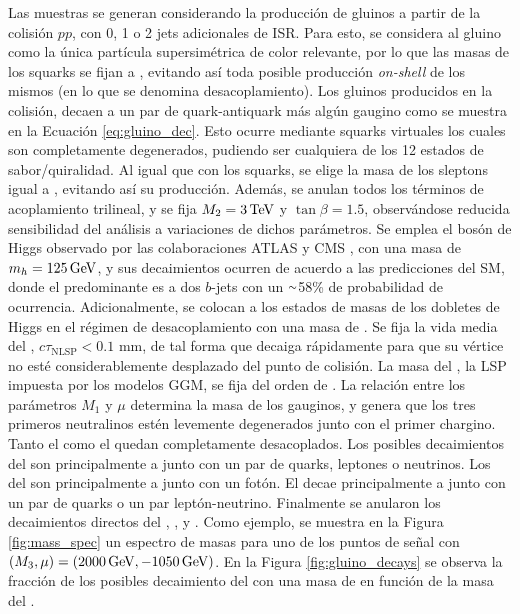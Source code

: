 Las muestras se generan considerando la producción de gluinos a partir de la colisión $pp$, con 0, 1 o 2 jets adicionales de ISR. Para esto, se considera al gluino como la única partícula supersimétrica de color relevante, por lo que las masas de los squarks se fijan a , evitando así toda posible producción \textit{on-shell} de los mismos (en lo que se denomina desacoplamiento). Los gluinos producidos en la colisión, decaen a un par de quark-antiquark más algún gaugino como se muestra en la Ecuación \ref{eq:gluino_dec}. Esto ocurre mediante squarks virtuales los cuales son completamente degenerados, pudiendo ser cualquiera de los 12 estados de sabor/quiralidad.
Al igual que con los squarks, se elige la masa de los sleptons igual a , evitando así su producción.
Además, se anulan todos los términos de acoplamiento trilineal, y se fija $M_2=3\,\text{TeV}$ y $\tan{\beta}=1.5$, observándose reducida sensibilidad del análisis a variaciones de dichos parámetros. Se emplea el bosón de Higgs observado por las colaboraciones ATLAS y CMS \cite{higgs_mass}, con una masa de $m_h=125\,\text{GeV}$, y sus decaimientos ocurren de acuerdo a las predicciones del SM, 
donde el predominante es a dos $b$-jets con un {$\smallsim$}58\% de probabilidad de ocurrencia.
Adicionalmente, se colocan a los estados de masas de los dobletes de Higgs en el régimen de desacoplamiento con una masa de .
Se fija la vida media del \ninoone, $c\tau_{\text{NLSP}}<0.1$ mm, de tal forma que decaiga rápidamente para que su vértice no esté considerablemente desplazado del punto de colisión. 
La masa del \gravino, la LSP impuesta por los modelos GGM, se fija del orden de .
La relación entre los parámetros $M_1$ y $\mu$ determina la masa de los gauginos, y genera que los tres primeros neutralinos estén levemente degenerados junto con el primer chargino. Tanto el \ninofour como el \chinotwopm quedan completamente desacoplados. Los posibles decaimientos del \ninotwo son principalmente a \ninoone junto con un par de quarks, leptones o neutrinos. Los del \ninothree son principalmente a \ninoone junto con un fotón. El \chinoonepm decae principalmente a \ninoone junto con un par de quarks o un par leptón-neutrino. Finalmente se anularon los decaimientos directos del \gluino, \ninotwo, \ninothree y \chinoonepm. Como ejemplo, se muestra en la Figura \ref{fig:mass_spec} un espectro de masas para uno de los puntos de señal con $(M_3, \mu) = (2000\,\text{GeV}, -1050\,\text{GeV})$. En la Figura \ref{fig:gluino_decays} se observa la fracción de los posibles decaimiento del \gluino con una masa de  en función de la masa del \ninoone. 


